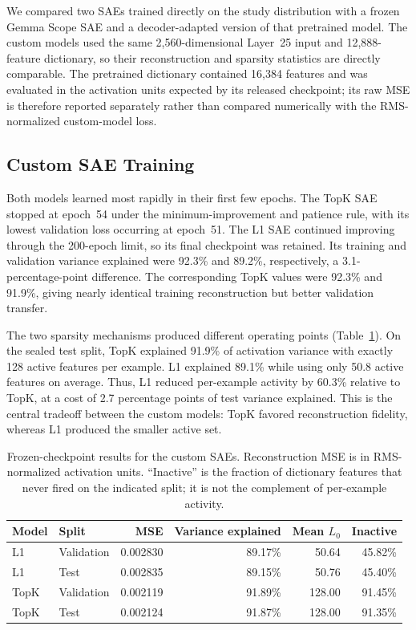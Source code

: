 We compared two SAEs trained directly on the study distribution with a frozen
Gemma Scope SAE and a decoder-adapted version of that pretrained model.  The
custom models used the same 2,560-dimensional Layer~25 input and
12,888-feature dictionary, so their reconstruction and sparsity statistics are
directly comparable.  The pretrained dictionary contained 16,384 features and
was evaluated in the activation units expected by its released checkpoint;
its raw MSE is therefore reported separately rather than compared numerically
with the RMS-normalized custom-model loss.

\subsection{Custom SAE Training}

Both models learned most rapidly in their first few epochs.  The TopK SAE
stopped at epoch~54 under the minimum-improvement and patience rule, with its
lowest validation loss occurring at epoch~51.  The L1 SAE continued improving
through the 200-epoch limit, so its final checkpoint was retained.  Its
training and validation variance explained were 92.3\% and
89.2\%, respectively, a 3.1-percentage-point difference.  The
corresponding TopK values were 92.3\% and 91.9\%, giving nearly identical
training reconstruction but better validation transfer.

The two sparsity mechanisms produced different operating points
(Table~\ref{tab:sae-custom-results}).  On the sealed test split, TopK explained
91.9\% of activation variance with exactly 128 active features per example.
L1 explained 89.1\% while using only 50.8 active features on average.  Thus,
L1 reduced per-example activity by 60.3\% relative to TopK, at a cost of 2.7
percentage points of test variance explained.  This is the central tradeoff
between the custom models: TopK favored reconstruction fidelity, whereas L1
produced the smaller active set.

\begin{table}[htbp]
    \centering
    \caption{Frozen-checkpoint results for the custom SAEs. Reconstruction MSE
    is in RMS-normalized activation units. ``Inactive'' is the fraction of
    dictionary features that never fired on the indicated split; it is not the
    complement of per-example activity.}
    \label{tab:sae-custom-results}
    \begin{tabular}{llrrrr}
        \toprule
        Model & Split & MSE & Variance explained & Mean $L_0$ & Inactive \\
        \midrule
        L1 & Validation & 0.002830 & 89.17\% & 50.64 & 45.82\% \\
        L1 & Test       & 0.002835 & 89.15\% & 50.76 & 45.40\% \\
        TopK & Validation & 0.002119 & 91.89\% & 128.00 & 91.45\% \\
        TopK & Test       & 0.002124 & 91.87\% & 128.00 & 91.35\% \\
        \bottomrule
    \end{tabular}
\end{table}

